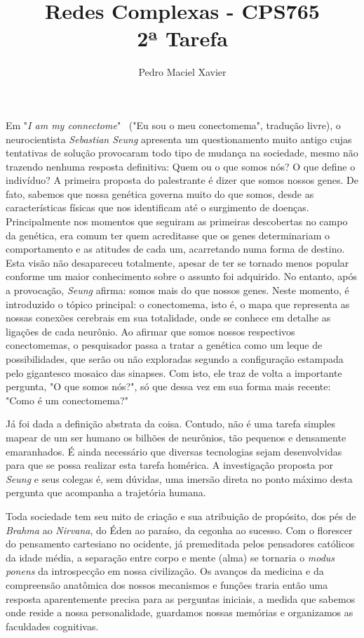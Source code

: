 \documentclass{homework}
\title{Redes Complexas - CPS765 \\[1ex]%
2ª Tarefa}
\author{Pedro Maciel Xavier}
\begin{document}
    \smaketitle %

    Em "\textit{I am my connectome}"~ ("Eu sou o meu conectomema", tradução livre), o neurocientista \textit{Sebastian Seung} apresenta um questionamento muito antigo cujas tentativas de solução provocaram todo tipo de mudança na sociedade, mesmo não trazendo nenhuma resposta definitiva: Quem ou o que somos nós? O que define o indivíduo? A primeira proposta do palestrante é dizer que somos nossos genes. De fato, sabemos que nossa genética governa muito do que somos, desde as características físicas que nos identificam até o surgimento de doenças. Principalmente nos momentos que seguiram as primeiras descobertas no campo da genética, era comum ter quem acreditasse que os genes determinariam o comportamento e as atitudes de cada um, acarretando numa forma de destino. Esta visão não desapareceu totalmente, apesar de ter se tornado menos popular conforme um maior conhecimento sobre o assunto foi adquirido. No entanto, após a provocação, \textit{Seung} afirma: somos mais do que nossos genes.
    Neste momento, é introduzido o tópico principal: o conectomema, isto é, o mapa que representa as nossas conexões cerebrais em sua totalidade, onde se conhece em detalhe as ligações de cada neurônio. Ao afirmar que somos nossos respectivos conectomemas, o pesquisador passa a tratar a genética como um leque de possibilidades, que serão ou não exploradas segundo a configuração estampada pelo gigantesco mosaico das sinapses. Com isto, ele traz de volta a importante pergunta, "O que somos nós?", só que dessa vez em sua forma mais recente: "Como é um conectomema?"%
    \par
    Já foi dada a definição abstrata da coisa. Contudo, não é uma tarefa simples mapear de um ser humano os bilhões de neurônios, tão pequenos e densamente emaranhados. É ainda necessário que diversas tecnologias sejam desenvolvidas para que se possa realizar esta tarefa homérica. A investigação proposta por \textit{Seung} e seus colegas é, sem dúvidas, uma imersão direta no ponto máximo desta pergunta que acompanha a trajetória humana.%
    \par
    Toda sociedade tem seu mito de criação e sua atribuição de propósito, dos pés de \textit{Brahma} ao \textit{Nirvana}, do Éden ao paraíso, da cegonha ao sucesso. Com o florescer do pensamento cartesiano no ocidente, já premeditada pelos pensadores católicos da idade média, a separação entre corpo e mente (alma) se tornaria o \textit{modus ponens} da introspecção em nossa civilização. Os avanços da medicina e da compreensão anatômica dos nossos mecanismos e funções traria então uma resposta aparentemente precisa para as perguntas iniciais, a medida que sabemos onde reside a nossa personalidade, guardamos nossas memórias e organizamos as faculdades cognitivas.%
\end{document}
